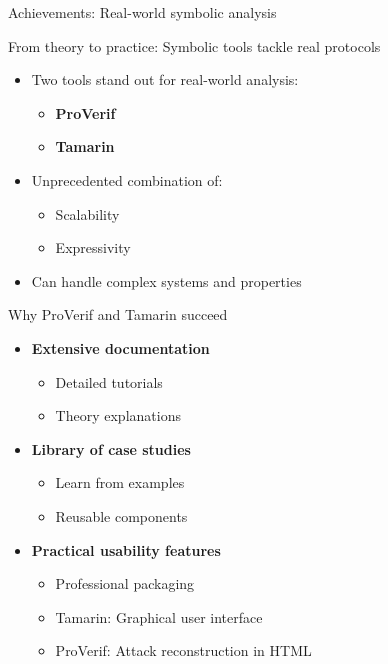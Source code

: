 \documentclass[aspectratio=169, lualatex, handout]{beamer}
\begin{document}
\begin{frame}{Achievements: Real-world symbolic analysis}
	\begin{center}
		\Large
		From theory to practice: Symbolic tools tackle real protocols
	\end{center}
	\vspace{1em}
	\begin{itemize}
		\item Two tools stand out for real-world analysis:
		      \begin{itemize}
			      \item \textbf{ProVerif}
			      \item \textbf{Tamarin}
		      \end{itemize}
		\item Unprecedented combination of:
		      \begin{itemize}
			      \item Scalability
			      \item Expressivity
		      \end{itemize}
		\item Can handle complex systems and properties
	\end{itemize}
\end{frame}

\begin{frame}{Why ProVerif and Tamarin succeed}
	\begin{itemize}
		\item \textbf{Extensive documentation}
		      \begin{itemize}
			      \item Detailed tutorials
			      \item Theory explanations
		      \end{itemize}
		\item \textbf{Library of case studies}
		      \begin{itemize}
			      \item Learn from examples
			      \item Reusable components
		      \end{itemize}
		\item \textbf{Practical usability features}
		      \begin{itemize}
			      \item Professional packaging
			      \item Tamarin: Graphical user interface
			      \item ProVerif: Attack reconstruction in HTML
		      \end{itemize}
	\end{itemize}
\end{frame}
\end{document}
